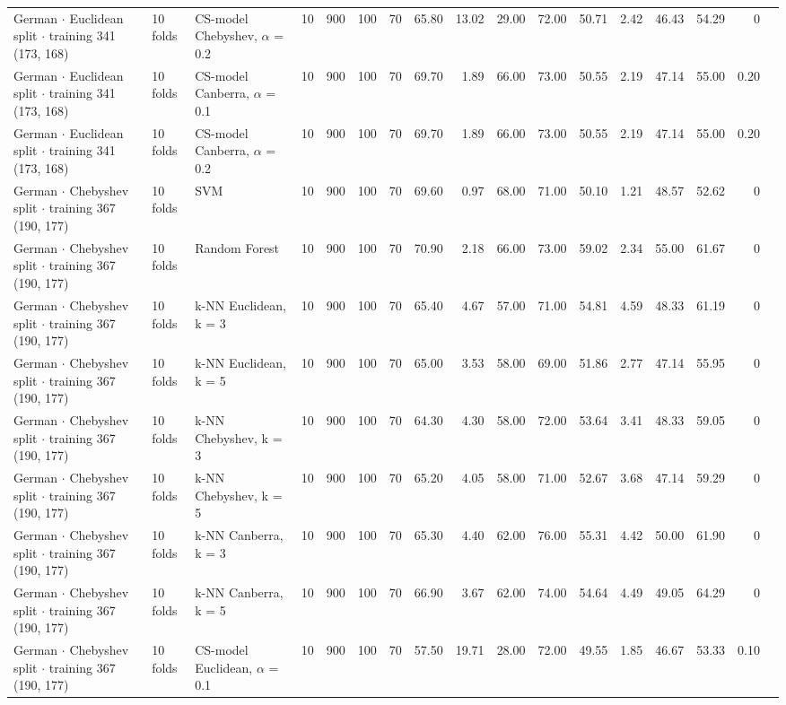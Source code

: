 \begin{longtable}{lllrrrrrrrrrrrrrl}
  German $\cdot$ Euclidean split $\cdot$ training 341 (173, 168) & 10 folds & CS-model Chebyshev, $\alpha$ = 0.2 & 10 & 900 & 100 & 70 & 65.80 & 13.02 & 29.00 & 72.00 & 50.71 & 2.42 & 46.43 & 54.29 & 0 &  \\
  German $\cdot$ Euclidean split $\cdot$ training 341 (173, 168) & 10 folds & CS-model Canberra, $\alpha$ = 0.1 & 10 & 900 & 100 & 70 & 69.70 & 1.89 & 66.00 & 73.00 & 50.55 & 2.19 & 47.14 & 55.00 & 0.20 &  \\
  German $\cdot$ Euclidean split $\cdot$ training 341 (173, 168) & 10 folds & CS-model Canberra, $\alpha$ = 0.2 & 10 & 900 & 100 & 70 & 69.70 & 1.89 & 66.00 & 73.00 & 50.55 & 2.19 & 47.14 & 55.00 & 0.20 &  \\
  German $\cdot$ Chebyshev split $\cdot$ training 367 (190, 177) & 10 folds & SVM & 10 & 900 & 100 & 70 & 69.60 & 0.97 & 68.00 & 71.00 & 50.10 & 1.21 & 48.57 & 52.62 & 0 &  \\
  German $\cdot$ Chebyshev split $\cdot$ training 367 (190, 177) & 10 folds & Random Forest & 10 & 900 & 100 & 70 & 70.90 & 2.18 & 66.00 & 73.00 & 59.02 & 2.34 & 55.00 & 61.67 & 0 &  \\
  German $\cdot$ Chebyshev split $\cdot$ training 367 (190, 177) & 10 folds & k-NN Euclidean, k = 3 & 10 & 900 & 100 & 70 & 65.40 & 4.67 & 57.00 & 71.00 & 54.81 & 4.59 & 48.33 & 61.19 & 0 &  \\
  German $\cdot$ Chebyshev split $\cdot$ training 367 (190, 177) & 10 folds & k-NN Euclidean, k = 5 & 10 & 900 & 100 & 70 & 65.00 & 3.53 & 58.00 & 69.00 & 51.86 & 2.77 & 47.14 & 55.95 & 0 &  \\
  German $\cdot$ Chebyshev split $\cdot$ training 367 (190, 177) & 10 folds & k-NN Chebyshev, k = 3 & 10 & 900 & 100 & 70 & 64.30 & 4.30 & 58.00 & 72.00 & 53.64 & 3.41 & 48.33 & 59.05 & 0 &  \\
  German $\cdot$ Chebyshev split $\cdot$ training 367 (190, 177) & 10 folds & k-NN Chebyshev, k = 5 & 10 & 900 & 100 & 70 & 65.20 & 4.05 & 58.00 & 71.00 & 52.67 & 3.68 & 47.14 & 59.29 & 0 &  \\
  German $\cdot$ Chebyshev split $\cdot$ training 367 (190, 177) & 10 folds & k-NN Canberra, k = 3 & 10 & 900 & 100 & 70 & 65.30 & 4.40 & 62.00 & 76.00 & 55.31 & 4.42 & 50.00 & 61.90 & 0 &  \\
  German $\cdot$ Chebyshev split $\cdot$ training 367 (190, 177) & 10 folds & k-NN Canberra, k = 5 & 10 & 900 & 100 & 70 & 66.90 & 3.67 & 62.00 & 74.00 & 54.64 & 4.49 & 49.05 & 64.29 & 0 &  \\
  German $\cdot$ Chebyshev split $\cdot$ training 367 (190, 177) & 10 folds & CS-model Euclidean, $\alpha$ = 0.1 & 10 & 900 & 100 & 70 & 57.50 & 19.71 & 28.00 & 72.00 & 49.55 & 1.85 & 46.67 & 53.33 & 0.10 &  \\

\end{longtable}
